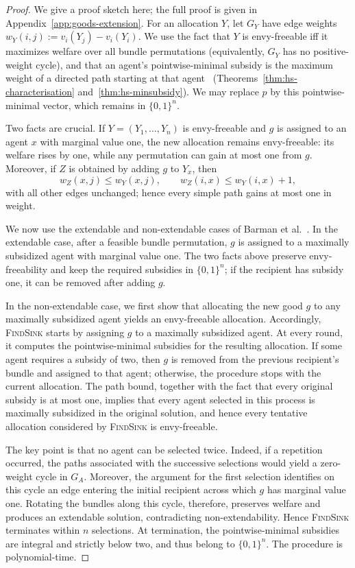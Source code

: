 \begin{proof}
We give a proof sketch here; the full proof is given in Appendix~\ref{app:goods-extension}. For an allocation $Y$, let $G_Y$ have edge weights $w_Y(i,j):=v_i(Y_j)-v_i(Y_i)$. We use the fact that $Y$ is envy-freeable iff it maximizes welfare over all bundle permutations (equivalently, $G_Y$ has no positive-weight cycle), and that an agent's pointwise-minimal subsidy is the maximum weight of a directed path starting at that agent~\cite{HS19} (Theorems~\ref{thm:hs-characterisation} and~\ref{thm:hs-minsubsidy}). We may replace $p$ by this pointwise-minimal vector, which remains in $\{0,1\}^n$.

Two facts are crucial. If $Y=(Y_1,\ldots,Y_n)$ is envy-freeable and $g$ is assigned to an agent $x$ with marginal value one, the new allocation remains envy-freeable: its welfare rises by one, while any permutation can gain at most one from $g$. Moreover, if $Z$ is obtained by adding $g$ to $Y_x$, then
\[
w_Z(x,j)\leq w_Y(x,j),\qquad w_Z(i,x)\leq w_Y(i,x)+1,
\]
with all other edges unchanged; hence every simple path gains at most one in weight.

We now use the extendable and non-extendable cases of Barman et al.~\cite{BKNS22}. In the extendable case, after a feasible bundle permutation, $g$ is assigned to a maximally subsidized agent with marginal value one. The two facts above preserve envy-freeability and keep the required subsidies in $\{0,1\}^n$; if the recipient has subsidy one, it can be removed after adding $g$.

In the non-extendable case, we first show that allocating the new good $g$ to any maximally subsidized agent yields an envy-freeable allocation. Accordingly, \textsc{FindSink} starts by assigning $g$ to a maximally subsidized agent. At every round, it computes the pointwise-minimal subsidies for the resulting allocation. If some agent requires a subsidy of two, then $g$ is removed from the previous recipient's bundle and assigned to that agent; otherwise, the procedure stops with the current allocation. The path bound, together with the fact that every original subsidy is at most one, implies that every agent selected in this process is maximally subsidized in the original solution, and hence every tentative allocation considered by \textsc{FindSink} is envy-freeable.

The key point is that no agent can be selected twice. Indeed, if a repetition occurred, the paths associated with the successive selections would yield a zero-weight cycle in $G_A$. Moreover, the argument for the first selection identifies on this cycle an edge entering the initial recipient across which $g$ has marginal value one. Rotating the bundles along this cycle, therefore, preserves welfare and produces an extendable solution, contradicting non-extendability. Hence \textsc{FindSink} terminates within $n$ selections. At termination, the pointwise-minimal subsidies are integral and strictly below two, and thus belong to $\{0,1\}^n$. The procedure is polynomial-time.
\end{proof}


